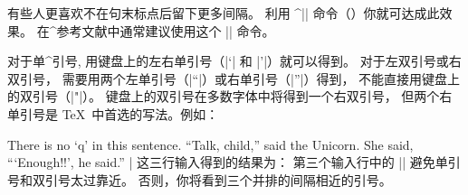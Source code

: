 有些人更喜欢不在句末标点后留下更多间隔。
利用 ^|\frenchspacing| 命令（\xref\frenchspacing ）你就可达成此效果。
在^{参考文献}中通常建议使用这个 |\frenchspacing| 命令。

对于单^{引号}, 用键盘上的左右单引号（|`| 和 |'|）就可以得到。
对于左双引号或右双引号，
需要用两个左单引号（|``|）或右单引号（|''|）得到，
不能直接用键盘上的双引号（|"|）。
键盘上的双引号在多数字体中将得到一个右双引号，
但两个右单引号是 \TeX\ 中首选的写法。例如：

\vbox{%
\csdisplay
There is no `q' in this sentence.
``Talk, child,'' said the Unicorn.
She said, ``\thinspace`Enough!!', he said.''
|
}%
这三行输入得到的结果为：
\noindent
第三个输入行中的 |\thinspace| 避免单引号和双引号太过靠近。
否则，你将看到三个并排的间隔相近的引号。

